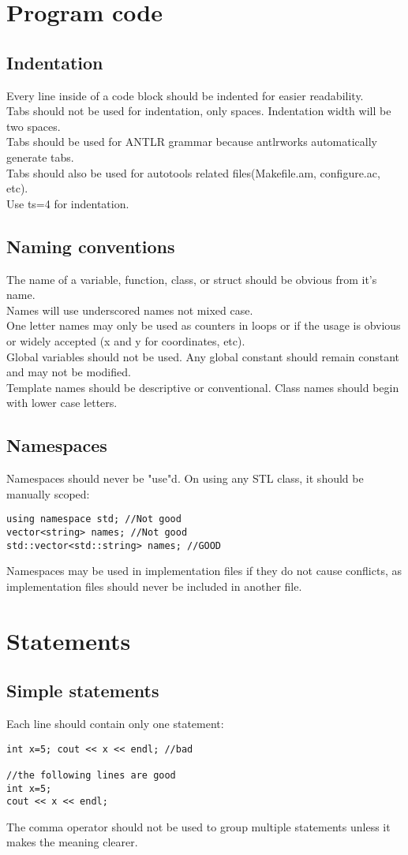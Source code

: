 \documentclass[letterpaper,10pt]{article}
\begin{document}
\section{Program code}
\subsection{Indentation}
Every line inside of a code block should be indented for easier readability.\\
Tabs should not be used for indentation, only spaces.  Indentation width will be two spaces. \\
Tabs should be used for ANTLR grammar because antlrworks automatically generate tabs. \\
Tabs should also be used for autotools related files(Makefile.am, configure.ac, etc). \\
Use ts=4 for indentation.
\subsection{Naming conventions}
The name of a variable, function, class, or struct should be obvious from it's name.\\
Names will use underscored names not mixed case.\\
One letter names may only be used as counters in loops or if the usage is obvious or widely accepted (x and y for coordinates, etc).\\
Global variables should not be used. Any global constant should remain constant and may not be modified.\\
Template names should be descriptive or conventional.
Class names should begin with lower case letters.
\subsection{Namespaces}
Namespaces should never be "use"d.  On using any STL class, it should be manually scoped:
\begin{verbatim}
using namespace std; //Not good
vector<string> names; //Not good
std::vector<std::string> names; //GOOD
\end{verbatim}
Namespaces may be used in implementation files if they do not cause conflicts, as implementation files should never be included in another file.
\section{Statements}
\subsection{Simple statements}
Each line should contain only one statement:
\begin{verbatim}
int x=5; cout << x << endl; //bad

//the following lines are good
int x=5;
cout << x << endl;
\end{verbatim}
The comma operator should not be used to group multiple statements unless it makes the meaning clearer.
\end{document}
